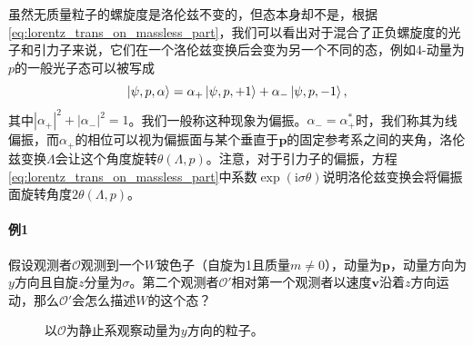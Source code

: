 虽然无质量粒子的螺旋度是洛伦兹不变的，但态本身却不是，根据\ref{eq:lorentz_trans_on_massless_part}，我们可以看出对于混合了正负螺旋度的光子和引力子来说，它们在一个洛伦兹变换后会变为另一个不同的态，例如4-动量为$ p$的一般光子态可以被写成
\begin{equation*}
	\ket{\psi ,p,\alpha } =\alpha _{+}\ket{\psi ,p,+1} +\alpha _{-}\ket{\psi ,p,-1} ,
\end{equation*}
其中$ | \alpha _{+}| ^{2} +| \alpha _{-}| ^{2} =1$。我们一般称这种现象为偏振。$ \alpha _{-} =\alpha _{+}^{*}$时，我们称其为线偏振，而$ \alpha _{+}$的相位可以视为偏振面与某个垂直于$ \boldsymbol{p}$的固定参考系之间的夹角，洛伦兹变换$ \Lambda $会让这个角度旋转$ \theta ( \Lambda ,p)$。注意，对于引力子的偏振，方程\ref{eq:lorentz_trans_on_massless_part}中系数$ \exp(\mathrm{i} \sigma \theta )$说明洛伦兹变换会将偏振面旋转角度$ 2\theta ( \Lambda ,p)$。

\paragraph{例1}
假设观测者$ \mathcal{O}$观测到一个$ W$玻色子（自旋为1且质量$ m\neq 0$），动量为$ \boldsymbol{p}$，动量方向为$ y$方向且自旋$ z$分量为$ \sigma $。第二个观测者$ \mathcal{O} '$相对第一个观测者以速度$ \boldsymbol{v}$沿着$ z$方向运动，那么$ \mathcal{O} '$会怎么描述$ W$的这个态？

\begin{figure}
	\centering
	
	
	
	\caption{以$\mathcal{O}$为静止系观察动量为$y$方向的粒子。}
\end{figure}

